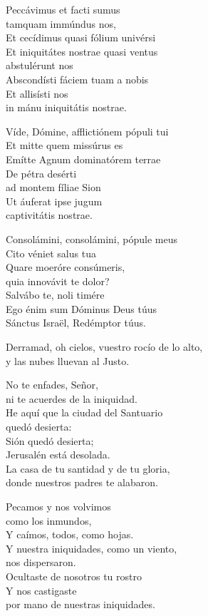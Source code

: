 Peccávimus et facti sumus\\ tamquam immúndus nos,\\ Et cecídimus quasi fólium univérsi\\ Et iniquitátes nostrae quasi ventus\\ abstulérunt nos\\ Abscondísti fáciem tuam a nobis\\ Et allisísti nos\\ in mánu iniquitátis nostrae.

Víde, Dómine, afflictiónem pópuli tui\\ Et mitte quem missúrus es\\ Emítte Agnum dominatórem terrae\\ De pétra desérti\\ ad montem fíliae Sion\\ Ut áuferat ipse jugum\\ captivitátis nostrae.

Consolámini, consolámini, pópule meus\\ Cito véniet salus tua\\ Quare moeróre consúmeris,\\ quia innovávit te dolor?\\ Salvábo te, noli timére\\ Ego énim sum Dóminus Deus túus\\ Sánctus Israël, Redémptor túus.\strut


Derramad, oh cielos, vuestro rocío de lo alto,\\ y las nubes lluevan al Justo.

No te enfades, Señor,\\ ni te acuerdes de la iniquidad.\\ He aquí que la ciudad del Santuario\\ quedó desierta:\\ Sión quedó desierta;\\ Jerusalén está desolada.\\ La casa de tu santidad y de tu gloria,\\ donde nuestros padres te alabaron.

Pecamos y nos volvimos\\ como los inmundos,\\ Y caímos, todos, como hojas.\\ Y nuestra iniquidades, como un viento,\\ nos dispersaron.\\ Ocultaste de nosotros tu rostro\\ Y nos castigaste\\ por mano de nuestras iniquidades.

